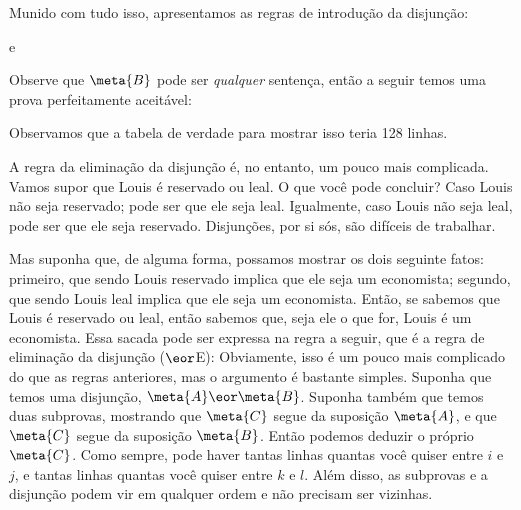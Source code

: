 Munido com tudo isso, apresentamos as regras de introdução da disjunção:

e

 

Observe que $\meta{B}$ pode ser \emph{qualquer} sentença, então a seguir temos uma prova perfeitamente aceitável:
\begin{fitchproof}
\end{fitchproof}


Observamos que a tabela de verdade para mostrar isso teria 128 linhas.

A regra da eliminação da disjunção é, no entanto, um pouco mais complicada. Vamos supor que  Louis é reservado ou leal.  O que você pode concluir? Caso  Louis  não seja reservado; pode ser que ele seja leal.   Igualmente, caso  Louis  não seja leal, pode ser que ele seja reservado.  Disjunções, por si sós, são difíceis de trabalhar.

Mas suponha que, de alguma forma, possamos mostrar os dois seguinte fatos: primeiro, que sendo Louis reservado implica que ele seja um economista; segundo, que sendo Louis leal implica que ele seja um economista.
Então, se sabemos que Louis é reservado ou leal, então sabemos que, seja ele o que for, Louis é um economista.
Essa sacada pode ser expressa na regra a seguir, que é a regra de eliminação da disjunção  ($\eor$E):
Obviamente, isso é um pouco mais complicado do que as regras anteriores, mas o argumento é bastante simples. Suponha que temos uma disjunção, $\meta{A} \eor \meta{B}$. Suponha também que temos duas subprovas, mostrando que $\meta{C}$ segue da suposição $\meta{A}$, e que $\meta{C}$ segue da suposição $\meta{B}$. Então podemos deduzir o próprio $\meta{C}$.
Como sempre, pode haver  tantas linhas quantas  você quiser entre   $i$ e $j$,   e tantas linhas quantas você quiser entre $k$ e $l$. Além disso, as subprovas e a disjunção podem vir em qualquer ordem e não precisam ser vizinhas.

